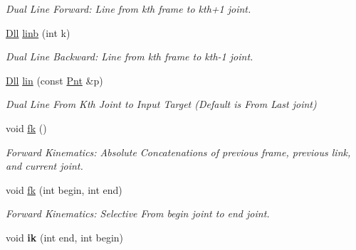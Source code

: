 \begin{DoxyCompactItemize}
\begin{DoxyCompactList}\small\item\em Dual Line Forward\-: Line from kth frame to kth+1 joint. \end{DoxyCompactList}\item 
\hypertarget{classvsr_1_1_chain_a2d85ed8f6bb8f381ca88b60e10fa7b96}{\hyperlink{namespacevsr_a6c6892b7aec25cfb16492501e2e35b11}{Dll} \hyperlink{classvsr_1_1_chain_a2d85ed8f6bb8f381ca88b60e10fa7b96}{linb} (int k)}\label{classvsr_1_1_chain_a2d85ed8f6bb8f381ca88b60e10fa7b96}

\begin{DoxyCompactList}\small\item\em Dual Line Backward\-: Line from kth frame to kth-\/1 joint. \end{DoxyCompactList}\item 
\hypertarget{classvsr_1_1_chain_aad6b7d63965149ca2fade1241cb85757}{\hyperlink{namespacevsr_a6c6892b7aec25cfb16492501e2e35b11}{Dll} \hyperlink{classvsr_1_1_chain_aad6b7d63965149ca2fade1241cb85757}{lin} (const \hyperlink{namespacevsr_a2d05beb9721c5d9211b479af6d47222d}{Pnt} \&p)}\label{classvsr_1_1_chain_aad6b7d63965149ca2fade1241cb85757}

\begin{DoxyCompactList}\small\item\em Dual Line From Kth Joint to Input Target (Default is From Last joint) \end{DoxyCompactList}\item 
\hypertarget{classvsr_1_1_chain_aad711a21317afebfff909da991d1d156}{void \hyperlink{classvsr_1_1_chain_aad711a21317afebfff909da991d1d156}{fk} ()}\label{classvsr_1_1_chain_aad711a21317afebfff909da991d1d156}

\begin{DoxyCompactList}\small\item\em Forward Kinematics\-: Absolute Concatenations of previous frame, previous link, and current joint. \end{DoxyCompactList}\item 
\hypertarget{classvsr_1_1_chain_a38fae145aa15855bb95e4dbc7ab9e80b}{void \hyperlink{classvsr_1_1_chain_a38fae145aa15855bb95e4dbc7ab9e80b}{fk} (int begin, int end)}\label{classvsr_1_1_chain_a38fae145aa15855bb95e4dbc7ab9e80b}

\begin{DoxyCompactList}\small\item\em Forward Kinematics\-: Selective From begin joint to end joint. \end{DoxyCompactList}\item 
\hypertarget{classvsr_1_1_chain_a004900fba1f2e49792cc8d461361a620}{void {\bfseries ik} (int end, int begin)}\label{classvsr_1_1_chain_a004900fba1f2e49792cc8d461361a620}


\end{DoxyCompactItemize}
